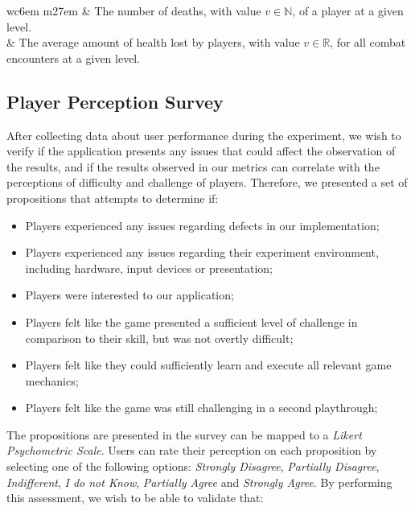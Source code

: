 \begin{table}[!ht]
\begin{center}
\begin{tabular}{ w{c}{6em} m{27em} }
         & The number of deaths, with value $v \in \mathbb{N}$, of a player at a given level. \\
         & The average amount of health lost by players, with value $v \in \mathbb{R}$, for all combat encounters at a given level.  \\
        \bottomrule
      \end{tabular}
    \end{center}
\end{table}

\subsection{Player Perception Survey}


After collecting data about user performance during the experiment, we wish to verify if the application presents any issues that could affect the observation of the results, and if the results observed in our metrics can correlate with the perceptions of difficulty and challenge of players. Therefore, we presented a set of propositions that attempts to determine if:

\begin{itemize}
    \item{Players experienced any issues regarding defects in our implementation;}
    \item{Players experienced any issues regarding their experiment environment, including hardware, input devices or presentation;}
    \item{Players were interested to our application;}
    \item{Players felt like the game presented a sufficient level of challenge in comparison to their skill, but was not overtly difficult;}
    \item{Players felt like they could sufficiently learn and execute all relevant game mechanics;}
    \item{Players felt like the game was still challenging in a second playthrough;}
\end{itemize}

The propositions are presented in the survey can be mapped to a \emph{Likert Psychometric Scale}. Users can rate their perception on each proposition by selecting one of the following options: \emph{Strongly Disagree}, \emph{Partially Disagree}, \emph{Indifferent}, \emph{I do not Know}, \emph{Partially Agree} and \emph{Strongly Agree}. By performing this assessment, we wish to be able to validate that:

